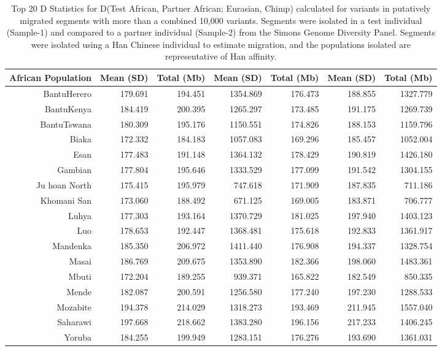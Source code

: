 \begin{table}[ht]
\centering
\begin{tabular}{rrrrrrr}
  \hline
African Population & Mean (SD) & Total (Mb) & Mean (SD) & Total (Mb) & Mean (SD) & Total (Mb) \\ 
  \hline
BantuHerero & 179.691 & 194.451 & 1354.869 & 176.473 & 188.855 & 1327.779 \\ 
  BantuKenya & 184.419 & 200.395 & 1265.297 & 173.485 & 191.175 & 1269.739 \\ 
  BantuTswana & 180.309 & 195.176 & 1150.551 & 174.826 & 188.153 & 1159.796 \\ 
  Biaka & 172.332 & 184.183 & 1057.083 & 169.296 & 185.457 & 1052.004 \\ 
  Esan & 177.483 & 191.148 & 1364.132 & 178.429 & 190.819 & 1426.180 \\ 
  Gambian & 177.804 & 195.646 & 1333.529 & 177.099 & 191.542 & 1304.155 \\ 
  Ju hoan North & 175.415 & 195.979 & 747.618 & 171.909 & 187.835 & 711.186 \\ 
  Khomani San & 173.060 & 188.492 & 671.125 & 169.005 & 183.871 & 706.777 \\ 
  Luhya & 177.303 & 193.164 & 1370.729 & 181.025 & 197.940 & 1403.123 \\ 
  Luo & 178.653 & 192.447 & 1368.481 & 175.618 & 192.833 & 1361.917 \\ 
  Mandenka & 185.350 & 206.972 & 1411.440 & 176.908 & 194.337 & 1328.754 \\ 
  Masai & 186.769 & 209.675 & 1353.890 & 182.366 & 198.060 & 1483.361 \\ 
  Mbuti & 172.204 & 189.255 & 939.371 & 165.822 & 182.549 & 850.335 \\ 
  Mende & 182.087 & 200.591 & 1256.580 & 177.240 & 197.230 & 1288.533 \\ 
  Mozabite & 194.378 & 214.029 & 1318.273 & 193.469 & 211.945 & 1557.040 \\ 
  Saharawi & 197.668 & 218.662 & 1383.280 & 196.156 & 217.233 & 1406.245 \\ 
  Yoruba & 184.255 & 199.949 & 1283.151 & 176.276 & 193.690 & 1361.031 \\ 
   \hline
\end{tabular}
\caption{Top 20 D Statistics for D(Test African, Partner African; Eurasian, Chimp) calculated for variants in putatively migrated segments with more than a combined 10,000 variants. Segments were isolated in a test individual (Sample-1) and compared to a partner individual (Sample-2) from the Simons Genome Diversity Panel. Segments were isolated using a Han Chinese individual to estimate migration, and the populations isolated are representative of Han affinity.} 
\label{dstats:top20m}
\end{table}
